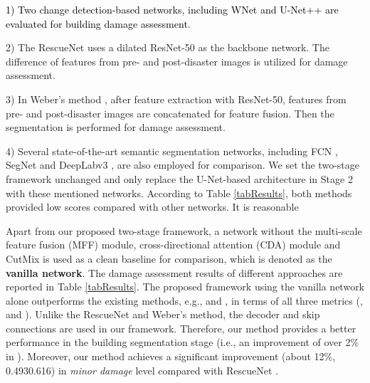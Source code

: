 \documentclass[journal]{IEEEtran}
\begin{document}
\textcolor{black}{
1) Two change detection-based networks, including WNet \cite{houWNetCDGANBitemporal2020} and U-Net++ \cite{pengEndtoEndChangeDetection2019} are evaluated for building damage assessment.}

2) The RescueNet \cite{gupta2020rescuenet} uses a dilated ResNet-50 as the backbone network. The difference of features from pre- and post-disaster images is utilized for damage assessment.

3) In Weber's method \cite{weber2020building}, after feature extraction with ResNet-50, features from pre- and post-disaster images are concatenated for feature fusion. Then the segmentation is performed for damage assessment.

4) Several state-of-the-art semantic segmentation networks, including FCN \cite{Long_2015_CVPR}, SegNet \cite{badrinarayananSegNetDeepConvolutional2017} and DeepLabv3 \cite{chen2017rethinking}, are also employed for comparison. We set the two-stage framework unchanged and only replace the U-Net-based architecture in Stage 2 with these mentioned networks. According to Table \ref{tabResults}, both methods provided low scores  compared with other networks. It is reasonable 

Apart from our proposed two-stage framework, a network without the multi-scale feature fusion (MFF) module, cross-directional attention (CDA) module and CutMix is used as a clean baseline for comparison, which is denoted as the \textbf{vanilla network}. The damage assessment results of different approaches are reported in Table \ref{tabResults}. The proposed framework using the vanilla network alone outperforms the existing methods, e.g., \cite{gupta2020rescuenet} and \cite{weber2020building}, in terms of all three metrics (,  and ). Unlike the RescueNet and Weber's method, the decoder and skip connections are used in  our framework. Therefore, our method provides a better performance in the building segmentation stage (i.e., an improvement of over 2\% in ). 
Moreover, our method achieves a significant improvement (about 12\%, 0.4930.616) in \textit{minor damage} level compared with RescueNet \cite{gupta2020rescuenet}. 
\end{document}
